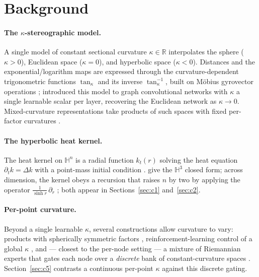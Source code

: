 \documentclass{article}
\newcommand{\R}{\mathbb{R}}
\newcommand{\Hyp}{\mathbb{H}}
\newcommand{\kp}{\kappa}
\begin{document}
\section{Background}
\label{sec:background}

\paragraph{The $\kp$-stereographic model.} A single model of constant
sectional curvature $\kp \in \R$ interpolates the sphere ($\kp > 0$),
Euclidean space ($\kp = 0$), and hyperbolic space ($\kp < 0$). Distances
and the exponential/logarithm maps are expressed through the
curvature-dependent trigonometric functions
$\tan_\kp$ and its inverse $\tan_\kp^{-1}$, built on M\"obius gyrovector
operations \citep{ungar2008gyrovector}; \citet{bachmann2020constant}
introduced this model to graph convolutional networks with $\kp$ a
single learnable scalar per layer, recovering the Euclidean network as
$\kp \to 0$. Mixed-curvature representations take products of such spaces
with fixed per-factor curvatures \citep{gu2019learning,skopek2020mixed}.

\paragraph{The hyperbolic heat kernel.} The heat kernel on $\Hyp^n$ is a
radial function $k_t(r)$ solving the heat equation
$\partial_t k = \Delta k$ with a point-mass initial condition
\citep{davies1989heat}.
\citet{daviesmandouvalos1988} give the $\Hyp^3$ closed form; across
dimension, the kernel obeys a recursion that raises $n$ by two by
applying the operator $\frac{1}{\sinh r}\,\partial_r$
\citep{grigoryan1998heat,grigoryan2009heat,yu2018heat}; both appear in
Sections~\ref{sec:c1} and~\ref{sec:c2}.

\paragraph{Per-point curvature.} Beyond a single learnable $\kp$, several
constructions allow curvature to vary: products with spherically
symmetric factors \citep{digiovanni2022heterogeneous}, reinforcement-learning
control of a global $\kp$ \citep{fu2021ace}, and --- closest to the
per-node setting --- a mixture of Riemannian experts that gates each node
over a \emph{discrete} bank of constant-curvature spaces
\citep{guo2025graphmore}. Section~\ref{sec:c5} contrasts a continuous
per-point $\kp$ against this discrete gating.
\end{document}
